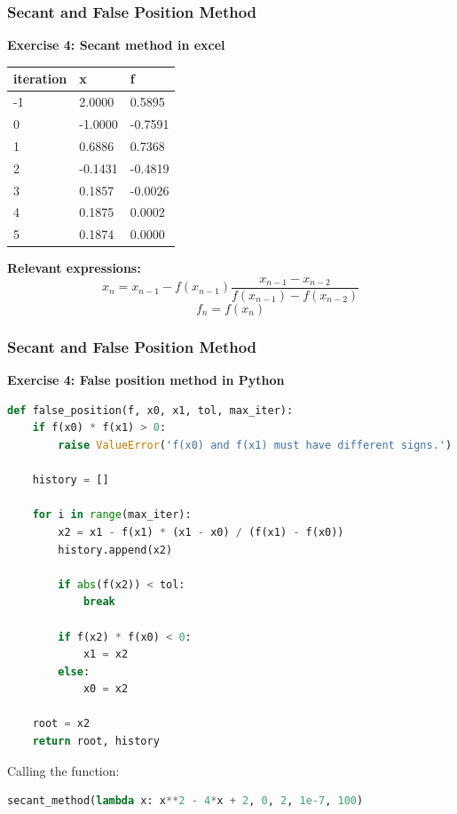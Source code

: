 \begin{frame}[fragile]
    \frametitle{Secant and False Position Method}

    \textbf{Exercise 4: Secant method in excel}
    
    \begin{table}[]
      \begin{tabular}{|l|l|l|}
      \hline
      iteration & x     & f     \\ \hline
      -1        & 2.0000  & 0.5895  \\ \hline
      0         & -1.0000 & -0.7591 \\ \hline
      1         & 0.6886  & 0.7368  \\ \hline
      2         & -0.1431 & -0.4819 \\ \hline
      3         & 0.1857  & -0.0026 \\ \hline
      4         & 0.1875  & 0.0002  \\ \hline
      5         & 0.1874  & 0.0000  \\ \hline
      \end{tabular}
      \end{table}
    \textbf{Relevant expressions:}
    \[
    x_{n} = x_{n-1} - f(x_{n-1})\frac{x_{n-1} - x_{n-2}}{f(x_{n-1}) - f(x_{n-2})}
    \]
    \[
    f_{n} = f(x_{n})
    \]
\end{frame}

\begin{frame}[fragile]
  \frametitle{Secant and False Position Method}

  \textbf{Exercise 4: False position method in Python}
  \begin{lstlisting}[language=Python,basicstyle=\scriptsize]
def false_position(f, x0, x1, tol, max_iter):
    if f(x0) * f(x1) > 0:
        raise ValueError('f(x0) and f(x1) must have different signs.')

    history = []

    for i in range(max_iter):
        x2 = x1 - f(x1) * (x1 - x0) / (f(x1) - f(x0))
        history.append(x2)

        if abs(f(x2)) < tol:
            break

        if f(x2) * f(x0) < 0:
            x1 = x2
        else:
            x0 = x2

    root = x2
    return root, history
  \end{lstlisting}
  
  Calling the function:
  \begin{lstlisting}[language=Python,basicstyle=\scriptsize]
secant_method(lambda x: x**2 - 4*x + 2, 0, 2, 1e-7, 100)
  \end{lstlisting}
\end{frame}

